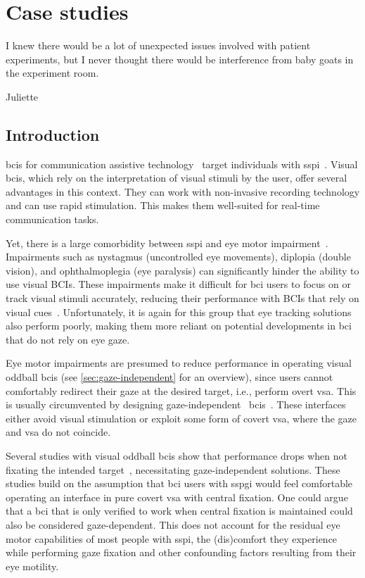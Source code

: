 \chapter{Case studies}
\label{sec:patients}
\epigraph{I knew there would be a lot of unexpected issues involved with
patient experiments, but I never thought there would be interference from baby
goats in the experiment room.}{Juliette}

\section{Introduction}

\Acp{bci} for communication assistive technology~\cite{Millan2010}
target individuals with \acf{sspi}~\cite{Peters2022}.
Visual \acp{bci}, which rely on the interpretation of visual stimuli by the user,
offer several advantages in this context.
They can work with non-invasive recording technology and can use rapid
stimulation.
This makes them well-suited for real-time communication tasks.

Yet, there is a large comorbidity between \ac{sspi} and eye motor impairment~\cite{FriedOken2020}.
Impairments such as nystagmus (uncontrolled eye movements), diplopia (double
vision), and ophthalmoplegia (eye paralysis) can significantly hinder
the ability to use visual BCIs. These impairments make it difficult for
\ac{bci} users to focus on or track visual stimuli accurately, reducing their
performance with BCIs that rely on visual cues~\cite{McCane2014,FriedOken2020,Pasqualotto2015}.
Unfortunately, it is again for this group that eye tracking solutions also
perform poorly, making them more reliant on potential developments in \ac{bci}
that do not rely on eye gaze.

Eye motor impairments are presumed to reduce performance in operating visual
oddball \ac{bci}s (see \cref{sec:gaze-independent} for an overview), since users
cannot comfortably redirect their gaze at the desired target,
i.e., perform overt \ac{vsa}.
This is usually circumvented by designing gaze-independent~
\acp{bci}~\cite{Riccio2012}.
These interfaces either avoid visual stimulation or exploit some form of
covert \ac{vsa}, where the gaze and \ac{vsa} do not coincide.

Several studies with visual oddball \acp{bci} show that performance drops when not fixating the intended
target~\cite{Brunner2010, Treder2010, RonAngevin2019}, necessitating
gaze-independent solutions.
These studies build on the assumption that \ac{bci} users with \ac{sspgi}
would feel comfortable operating an interface in pure covert \ac{vsa} with
central fixation.
One could argue that a \ac{bci} that is only verified to work when central
fixation is maintained could also be considered gaze-dependent.
This does not account for the residual eye motor capabilities of most people
with \ac{sspi}, the (dis)comfort they experience while
performing gaze fixation and other confounding factors resulting from their eye
motility.

